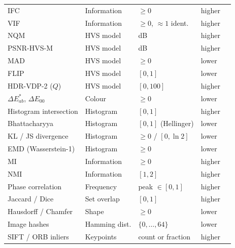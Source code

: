 \begin{longtable}{@{}p{3.7cm}p{2.3cm}p{3.2cm}p{1.5cm}p{2.3cm}@{}}
IFC                 & Information   & $\ge0$               & higher & \citep{sheikh2005ifc}\\
VIF                 & Information   & $\ge0$, $\approx1$ ident. & higher & \citep{sheikh2006vif}\\
NQM                 & HVS model     & dB                   & higher & \citep{damera2000nqm}\\
PSNR-HVS-M          & HVS model     & dB                   & higher & \citep{ponomarenko2007psnrhvsm}\\
MAD                 & HVS model     & $\ge0$               & lower  & \citep{larson2010mad}\\
FLIP                & HVS model     & $[0,1]$              & lower  & \citep{andersson2020flip}\\
HDR-VDP-2 ($Q$)     & HVS model     & $[0,100]$            & higher & \citep{mantiuk2011hdrvdp}\\
$\Delta E^*_{ab}$, $\Delta E_{00}$ & Colour & $\ge0$           & lower  & \citep{cie142,sharma2005}\\
Histogram intersection & Histogram  & $[0,1]$              & higher & \citep{swain1991}\\
Bhattacharyya       & Histogram     & $[0,1]$ (Hellinger)  & lower  & \citep{bhattacharyya1943}\\
KL / JS divergence  & Histogram     & $\ge0$ / $[0,\ln2]$  & lower  & \citep{kullback1951,lin1991js}\\
EMD (Wasserstein-1) & Histogram     & $\ge0$               & lower  & \citep{rubner2000}\\
MI                  & Information   & $\ge0$               & higher & \citep{viola1997,maes1997}\\
NMI                 & Information   & $[1,2]$              & higher & \citep{studholme1999}\\
Phase correlation   & Frequency     & peak $\in[0,1]$      & higher & \citep{kuglin1975}\\
Jaccard / Dice      & Set overlap   & $[0,1]$              & higher & \citep{jaccard1912,dice1945}\\
Hausdorff / Chamfer & Shape         & $\ge0$               & lower  & \citep{huttenlocher1993,barrow1977}\\
Image hashes        & Hamming dist. & $\{0,\dots,64\}$     & lower  & \citep{zauner2010}\\
SIFT / ORB inliers  & Keypoints     & count or fraction    & higher & \citep{lowe2004,rublee2011}\\
\end{longtable}
\endgroup
